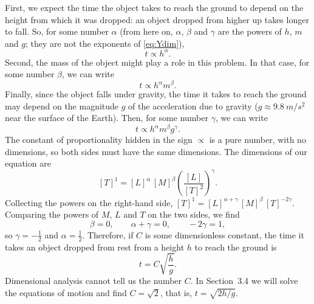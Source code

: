 \documentclass[11pt,a4paper]{article}
\begin{document}
First, we expect the time the object takes to reach the ground to depend on the height from which
it was dropped: an object dropped from higher up takes longer to fall. So, for some number
$\alpha$ (from here on, $\alpha$, $\beta$ and $\gamma$ are the powers of $h$, $m$ and $g$; they
are not the exponents of \eqref{eq:Ydim}),
\begin{equation}\label{eq:t-h}
  t \propto h^{\alpha} .
\end{equation}
Second, the mass of the object might play a role in this problem. In that case, for some number
$\beta$, we can write
\begin{equation}\label{eq:t-hm}
  t \propto h^{\alpha} m^{\beta} .
\end{equation}
Finally, since the object falls under gravity, the time it takes to reach the ground may depend on
the magnitude $g$ of the acceleration due to gravity ($g \approx \qty{9.8}{m/s^2}$ near the
surface of the Earth). Then, for some number $\gamma$, we can write
\begin{equation}\label{eq:t-hmg}
  t \propto h^{\alpha} m^{\beta} g^{\gamma} .
\end{equation}
The constant of proportionality hidden in the sign $\propto$ is a pure number, with no
dimensions, so both sides must have the same dimensions. The dimensions of our equation are
\begin{equation}\label{eq:ff-dims}
  [T]^1 = [L]^{\alpha}\,[M]^{\beta}\left(\frac{[L]}{[T]^2}\right)^{\gamma} .
\end{equation}
Collecting the powers on the right-hand side, $[T]^1 = [L]^{\alpha+\gamma}\,[M]^{\beta}\,
[T]^{-2\gamma}$. Comparing the powers of $M$, $L$ and $T$ on the two sides, we find
\begin{equation}\label{eq:ff-exps}
  \beta = 0 , \qquad \alpha + \gamma = 0 , \qquad -2\gamma = 1 ,
\end{equation}
so $\gamma = -\frac{1}{2}$ and $\alpha = \frac{1}{2}$. Therefore, if $C$ is some dimensionless
constant, the time it takes an object dropped from rest from a height $h$ to reach the ground is
\begin{equation}\label{eq:ff-t}
  t = C\sqrt{\frac{h}{g}} .
\end{equation}
Dimensional analysis cannot tell us the number $C$. In Section~3.4 we will solve the equations of
motion and find $C = \sqrt{2}$, that is, $t = \sqrt{2h/g}$.
\end{document}
